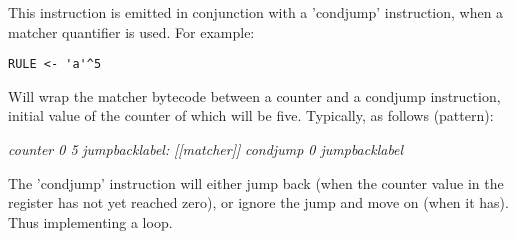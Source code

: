 This instruction is emitted in conjunction with a 'condjump'
instruction, when a matcher quantifier is used.
For example:

\begin{myquote}
\begin{verbatim}
RULE <- 'a'^5
\end{verbatim}
\end{myquote}

Will wrap the matcher bytecode between a counter and a condjump
instruction, initial value of the counter of which will be five.
Typically, as follows (pattern):

\begin{myquote}
\textit{counter 0 5} \newline
\textit{jumpbacklabel:} \newline
\textit{[[matcher]]} \newline
\textit{condjump 0 jumpbacklabel} \newline
\end{myquote}

The 'condjump' instruction will either jump back (when the counter
value in the register has not yet reached zero), or ignore the
jump and move on (when it has). Thus implementing a loop.
